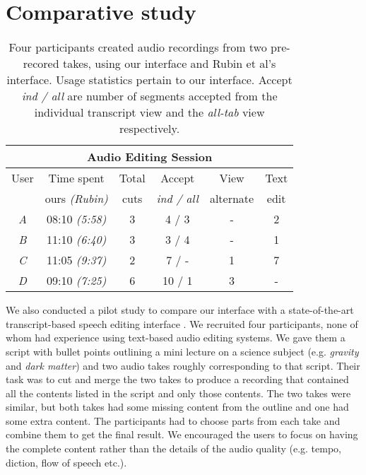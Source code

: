 \section{Comparative study}
\begin{table}[t]
\center
{}
\begin{tabular}{c|cccccc}
\multicolumn{7}{c}{\textbf{Audio Editing Session}}\\\hline
{User}&\multicolumn{2}{c}{Time spent}& {Total} & {Accept}
&{View}&{Text} \\
{}&\multicolumn{2}{c}{ours \textit{(Rubin)}}&{cuts}&{\textit{ind
/ all}}&{alternate}&{edit}
\\\hline
\textit{A}&\multicolumn{2}{c}{08:10 \textit{(5:58)}}&{3}& {4
/ 3}&{-}&{2}\\
\textit{B}  &\multicolumn{2}{c}{11:10 \textit{(6:40)}}&{3}&{3
/ 4}&{-}&{1}\\
\textit{C}&\multicolumn{2}{c}{11:05 \textit{(9:37)}}&{2}& {7
/ -}&{1}&{7}\\
\textit{D}&\multicolumn{2}{c}{09:10 \textit{(7:25)}}&{6}& {10
/ 1}&{3}&{-}
\\\hline
\end{tabular} 
\label{tab:editing}
\caption{Four participants created audio
recordings from two pre-recored takes, using our interface and
Rubin et al's interface. Usage statistics pertain to our interface.
Accept \textit{ind / all} are number of segments accepted from
the individual transcript view and the \textit{all-tab} view
respectively.}
\end{table} 

We also conducted a pilot study to compare our interface with
a state-of-the-art transcript-based speech editing interface
\cite{rubin2013content}. We recruited four participants, none of whom had
experience using text-based audio editing systems. We gave them
a script with bullet points outlining a mini lecture on a science
subject (e.g. \textit{gravity} and \textit{dark matter}) and
two audio takes roughly corresponding to that script. Their task
was to cut and merge the two takes to produce a recording that
contained all the contents listed in the script and only those
contents. The two takes were similar, but both takes had some
missing content from the outline and one had some extra
content. The participants had to choose parts from each take
and combine them to get the final result. We encouraged the users
to focus on having the complete content rather than the details
of the audio quality (e.g. tempo, diction, flow of speech etc.).

